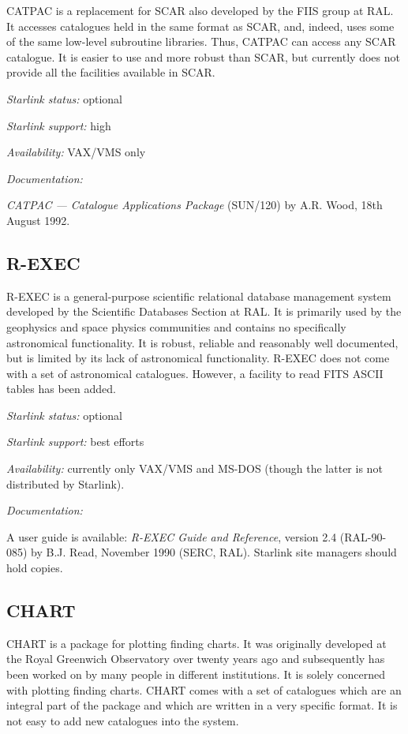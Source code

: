 \documentclass[twoside,11pt]{article}
\newcommand{\xref}[3]{#1}
\newcommand{\xlabel}[1]{}
\begin{document}
CATPAC is a replacement for SCAR also developed by the FIIS group at
RAL. It accesses catalogues held in the same format as SCAR, and,
indeed, uses some of the same low-level subroutine libraries. Thus,
CATPAC can access any SCAR catalogue. It is easier to use and more
robust than SCAR, but currently does not provide all the facilities
available in SCAR.

{\it Starlink status:} optional

{\it Starlink support:} high

{\it Availability:} VAX/VMS only

{\it Documentation:}

{\it CATPAC --- Catalogue Applications Package}
\xref{(SUN/120}{sun120}{}) by A.R. Wood,
18th August 1992.

\subsection{R-EXEC\xlabel{rexec}}

R-EXEC is a general-purpose scientific relational database management
system developed by the Scientific Databases Section at RAL. It is
primarily used by the geophysics and space physics communities and
contains no specifically astronomical functionality. It is robust,
reliable and reasonably well documented, but is limited by its lack of
astronomical functionality. R-EXEC does not come with a set of
astronomical catalogues. However, a facility to read FITS ASCII tables
has been added.

{\it Starlink status:} optional

{\it Starlink support:} best efforts

{\it Availability: } currently only VAX/VMS and MS-DOS (though the
latter is not distributed by Starlink).

{\it Documentation: }

A user guide is available: {\it R-EXEC Guide and Reference}, version
2.4 (RAL-90-085) by B.J. Read, November 1990 (SERC, RAL). Starlink site
managers should hold copies.

\subsection{CHART\xlabel{chart}}

CHART is a package for plotting finding charts. It was originally
developed at the Royal Greenwich Observatory over twenty years ago and
subsequently has been worked on by many people in different
institutions. It is solely concerned with plotting finding charts. CHART
comes with a set of catalogues which are an integral part of the package
and which are written in a very specific format. It is not easy to add
new catalogues into the system.
\end{document}
